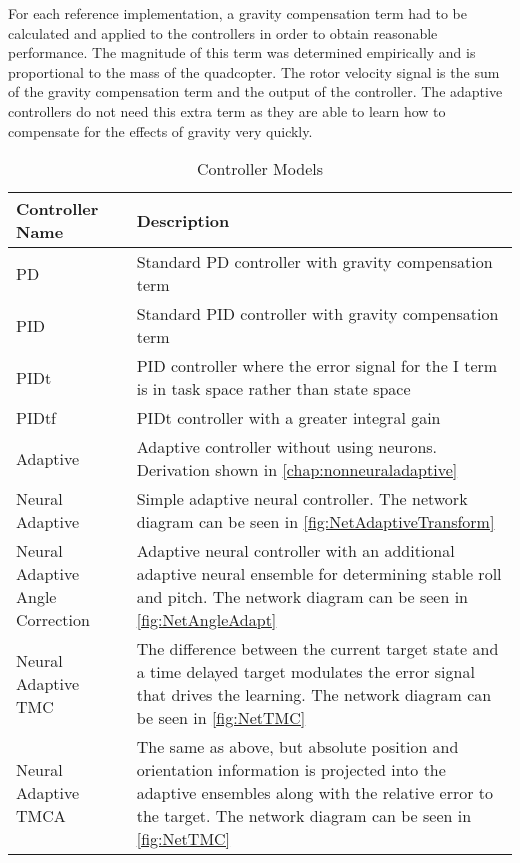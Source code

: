\documentclass[letterpaper,12pt,titlepage,oneside,final]{book}
\begin{document}

For each reference implementation, a gravity compensation term had to be calculated and applied to the controllers in order to obtain reasonable performance. 
The magnitude of this term was determined empirically and is proportional to the mass of the quadcopter. 
The rotor velocity signal is the sum of the gravity compensation term and the output of the controller.
The adaptive controllers do not need this extra term as they are able to learn how to compensate for the effects of gravity very quickly.

\begin{table}
\caption{Controller Models} \label{table:controller_models}
\begin{center}
\begin{tabular}{| l | p{9cm} |}

\hline
\textbf{Controller Name} & \textbf{Description} \\ \hline
PD & Standard PD controller with gravity compensation term \\ \hline
PID & Standard PID controller with gravity compensation term \\ \hline
PIDt & PID controller where the error signal for the I term is in task space rather than state space \\ \hline
PIDtf & PIDt controller with a greater integral gain \\ \hline
Adaptive &  Adaptive controller without using neurons. Derivation shown in \autoref{chap:nonneuraladaptive} \\ \hline %
Neural Adaptive & Simple adaptive neural controller. The network diagram can be seen in \autoref{fig:NetAdaptiveTransform} \\ \hline
Neural Adaptive Angle Correction & Adaptive neural controller with an additional adaptive neural ensemble for determining stable roll and pitch. The network diagram can be seen in \autoref{fig:NetAngleAdapt} \\ \hline
Neural Adaptive TMC & The difference between the current target state and a time delayed target modulates the error signal that drives the learning. The network diagram can be seen in \autoref{fig:NetTMC} \\ \hline
Neural Adaptive TMCA & The same as above, but absolute position and orientation information is projected into the adaptive ensembles along with the relative error to the target. The network diagram can be seen in \autoref{fig:NetTMC} \\ \hline

\end{tabular}
\end{center}
\end{table}
\end{document}
